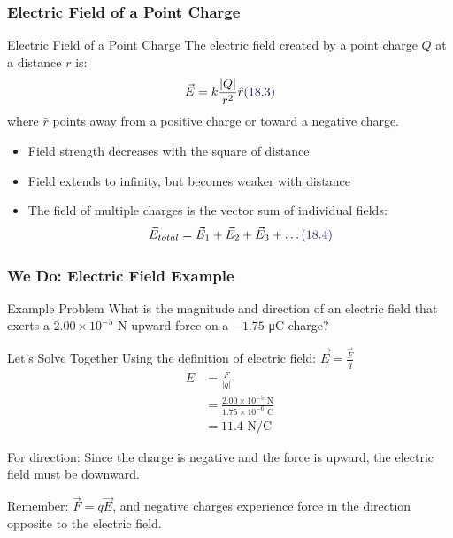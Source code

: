 \documentclass{beamer}
\newcommand{\highlight}[1]{\textcolor{ds9red}{#1}}
\newcommand{\eqnlabel}[1]{\textcolor{ds9blue}{(#1)}}
\begin{document}
\begin{frame}
    \frametitle{Electric Field of a Point Charge}
    
    \begin{block}{Electric Field of a Point Charge}
        The electric field created by a point charge $Q$ at a distance $r$ is:
        \begin{equation}
            \vec{E} = k\frac{|Q|}{r^2}\hat{r} \eqnlabel{18.3}
        \end{equation}
        where $\hat{r}$ points away from a positive charge or toward a negative charge.
    \end{block}
    
    \begin{itemize}
        \item Field strength \highlight{decreases} with the square of distance
        \item Field extends to infinity, but becomes weaker with distance
        \item The field of multiple charges is the \highlight{vector sum} of individual fields:
        \begin{equation}
            \vec{E}_{total} = \vec{E}_1 + \vec{E}_2 + \vec{E}_3 + \ldots \eqnlabel{18.4}
        \end{equation}
    \end{itemize}
\end{frame}

\begin{frame}
    \frametitle{We Do: Electric Field Example}
    
    \begin{exampleblock}{Example Problem}
        What is the magnitude and direction of an electric field that exerts a $2.00 \times 10^{-5}$ N upward force on a $-1.75$ μC charge?
    \end{exampleblock}
    \end{frame}

\begin{frame}
    \begin{block}{Let's Solve Together}
        Using the definition of electric field: $\vec{E} = \frac{\vec{F}}{q}$
        \begin{align}
            E &= \frac{F}{|q|}\\
            &= \frac{2.00 \times 10^{-5} \text{ N}}{1.75 \times 10^{-6} \text{ C}}\\
            &= 11.4 \text{ N/C}
        \end{align}
        
        For direction: Since the charge is \highlight{negative} and the force is \highlight{upward}, the electric field must be \highlight{downward}. 
        
        Remember: $\vec{F} = q\vec{E}$, and negative charges experience force in the direction \highlight{opposite} to the electric field.
    \end{block}
\end{frame}
\end{document}
